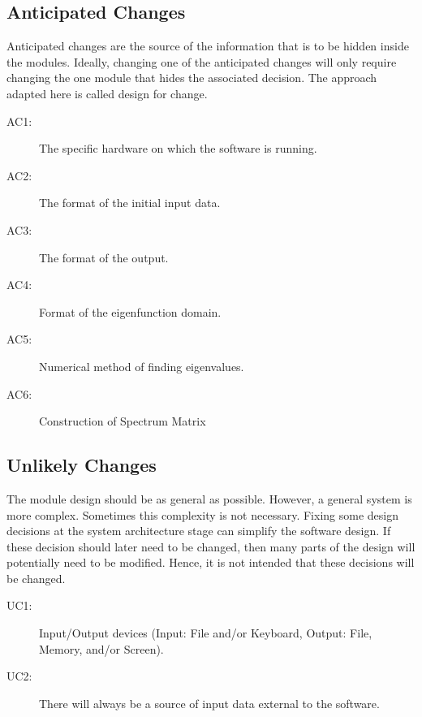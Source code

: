 \documentclass[12pt, titlepage]{article}
\begin{document}
\subsection{Anticipated Changes} \label{SecAchange}

Anticipated changes are the source of the information that is to be hidden
inside the modules. Ideally, changing one of the anticipated changes will only
require changing the one module that hides the associated decision. The approach
adapted here is called design for
change.

\begin{description}
\item[AC1:] The specific hardware on which the software is running.\\
\item[AC2:] The format of the initial input data.\\
\item[AC3:] The format of the output.\\
\item[AC4:] Format of the eigenfunction domain. \\
\item[AC5:] Numerical method of finding eigenvalues. \\ 
\item[AC6:] Construction of Spectrum Matrix \\ 
\end{description}

\subsection{Unlikely Changes} \label{SecUchange}

The module design should be as general as possible. However, a general system is
more complex. Sometimes this complexity is not necessary. Fixing some design
decisions at the system architecture stage can simplify the software design. If
these decision should later need to be changed, then many parts of the design
will potentially need to be modified. Hence, it is not intended that these
decisions will be changed.

\begin{description}
\item[UC1:] Input/Output devices
  (Input: File and/or Keyboard, Output: File, Memory, and/or Screen).\\
\item[UC2:] There will always be
  a source of input data external to the software.\\

\end{description}
\end{document}
